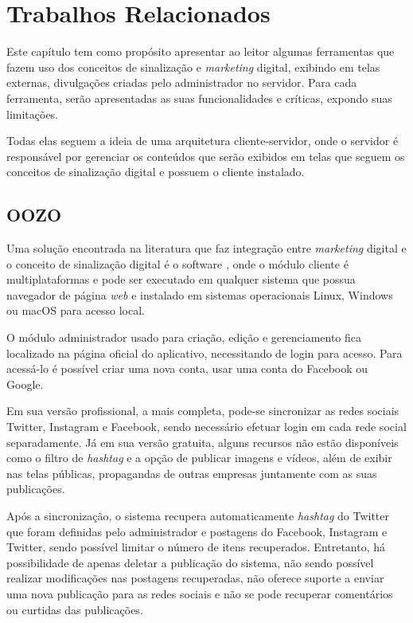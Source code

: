 \chapter[Trabalhos Relacionados]{Trabalhos Relacionados}
\label{relacionados}
Este capítulo tem como propósito apresentar ao leitor algumas ferramentas que fazem uso dos conceitos de sinalização e \textit{marketing} digital, exibindo em telas externas, divulgações criadas pelo administrador no servidor. Para cada ferramenta, serão apresentadas as suas funcionalidades e críticas, expondo suas limitações.

Todas elas seguem a ideia de uma arquitetura cliente-servidor, onde o servidor é responsável por gerenciar os conteúdos que serão exibidos em telas que seguem os conceitos de sinalização digital e possuem o cliente instalado.

\section{OOZO}
\label{sec:oozo}
Uma solução encontrada na literatura que faz integração entre \textit{marketing} digital e o conceito de sinalização digital é o software \cite{oozo2017}, onde o módulo cliente é multiplataformas e pode ser executado em qualquer sistema que possua navegador de página \textit{web} e instalado em sistemas operacionais Linux, Windows ou macOS para acesso local.

O módulo administrador usado para criação, edição e gerenciamento fica localizado na página oficial do aplicativo, necessitando de login para acesso. Para acessá-lo é possível criar uma nova conta, usar uma conta do Facebook ou Google. 

Em sua versão profissional, a mais completa, pode-se sincronizar as redes sociais Twitter, Instagram e Facebook, sendo necessário efetuar login em cada rede social separadamente. Já em sua versão gratuita, alguns recursos não estão disponíveis como o filtro de \textit{hashtag} e a opção de publicar imagens e vídeos, além de exibir nas telas públicas, propagandas de outras empresas juntamente com as suas publicações. 

Após a sincronização, o sistema recupera automaticamente \textit{hashtag} do Twitter que foram definidas pelo administrador e postagens do Facebook, Instagram e Twitter, sendo possível limitar o número de itens recuperados. Entretanto, há possibilidade de apenas deletar a publicação do sistema, não sendo possível realizar modificações nas postagens recuperadas, não oferece suporte a enviar uma nova publicação para as redes sociais e não se pode recuperar comentários ou curtidas das publicações.

